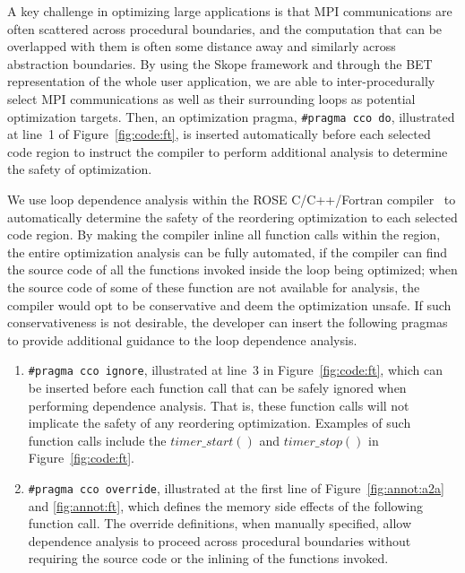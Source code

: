 A key challenge in optimizing large applications is that MPI
communications are often scattered across procedural boundaries, and
the computation that can be overlapped with them is often some
distance away and similarly across abstraction boundaries. By using
the Skope framework and through the BET representation of the whole
user application, we are able to inter-procedurally select MPI
communications as well as their surrounding loops as potential optimization targets.
Then, an optimization pragma,  \texttt{\#pragma cco do}, 
illustrated at line~1 of Figure~\ref{fig:code:ft}, is inserted automatically before each selected code region
to instruct the compiler to perform additional analysis to determine the safety of optimization.

We use loop dependence analysis within the ROSE C/C++/Fortran compiler~\cite {ROSE} to automatically 
determine the safety of the reordering optimization to each selected code
region. By making the compiler inline all function calls within the region, the entire optimization analysis can be fully automated, if the compiler can find the source code of all the functions invoked inside the loop being optimized; when the source code of some of these function are not available for analysis, the compiler would opt to be conservative and deem the optimization unsafe. If such conservativeness is not desirable, the developer can 
insert the following pragmas to provide additional guidance to the loop dependence analysis. 

\begin{enumerate}

\item \texttt{\#pragma cco ignore}, illustrated at line~3 in
  Figure~\ref{fig:code:ft}, which can be inserted before each
  function call that can be safely ignored when performing dependence
  analysis. That is, these function calls will not implicate the
  safety of any reordering optimization.
  Examples of such function calls include the
  $timer\_start()$ and $timer\_stop()$ in Figure~\ref{fig:code:ft}.

\item \texttt{\#pragma cco override}, illustrated at the first line of
  Figure~\ref{fig:annot:a2a} and \ref{fig:annot:ft}, which defines the
  memory side effects of the following function call.  The override
  definitions, when manually specified, allow dependence analysis to proceed
  across procedural boundaries without requiring the source code or the inlining of the functions invoked. 

\end{enumerate}

